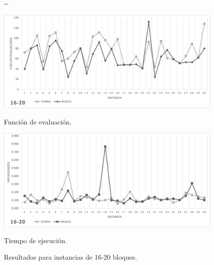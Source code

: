 \documentclass[letter, 10pt]{article}
\begin{document}
\begin{figure}[H]
    \begin{adjustwidth}{-\marginparwidth}{-\marginparwidth}
        \centering
        \begin{minipage}{.5\linewidth}
            \centering
            \includegraphics[width=\linewidth]{./img/16-20.png}
            \caption*{Función de evaluación.}
            \label{fig:16-20_g}
        \end{minipage}%
        \begin{minipage}{.5\linewidth}
            \centering
            \includegraphics[width=\linewidth]{./img/16-20_t.png}
            \caption*{Tiempo de ejecución.}
            \label{fig:16-20_t}
        \end{minipage}
    \end{adjustwidth}
    \caption{Resultados para instancias de 16-20 bloques.}
    \label{fig:16-20}
\end{figure}
\end{document}
